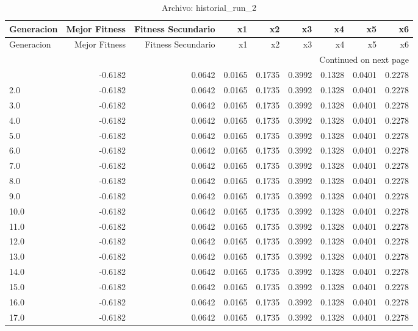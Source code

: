 \begin{longtable}{lrrrrrrrr}
\caption{Archivo: historial\_run\_2}\label{tab:historial_run_2} \\
\toprule
Generacion & Mejor Fitness & Fitness Secundario & x1 & x2 & x3 & x4 & x5 & x6 \\
\midrule
\endfirsthead
\toprule
Generacion & Mejor Fitness & Fitness Secundario & x1 & x2 & x3 & x4 & x5 & x6 \\
\midrule
\endhead
\midrule
\multicolumn{9}{r}{Continued on next page} \\
\midrule
\endfoot
\bottomrule
\endlastfoot
1.0 & -0.6182 & 0.0642 & 0.0165 & 0.1735 & 0.3992 & 0.1328 & 0.0401 & 0.2278 \\
2.0 & -0.6182 & 0.0642 & 0.0165 & 0.1735 & 0.3992 & 0.1328 & 0.0401 & 0.2278 \\
3.0 & -0.6182 & 0.0642 & 0.0165 & 0.1735 & 0.3992 & 0.1328 & 0.0401 & 0.2278 \\
4.0 & -0.6182 & 0.0642 & 0.0165 & 0.1735 & 0.3992 & 0.1328 & 0.0401 & 0.2278 \\
5.0 & -0.6182 & 0.0642 & 0.0165 & 0.1735 & 0.3992 & 0.1328 & 0.0401 & 0.2278 \\
6.0 & -0.6182 & 0.0642 & 0.0165 & 0.1735 & 0.3992 & 0.1328 & 0.0401 & 0.2278 \\
7.0 & -0.6182 & 0.0642 & 0.0165 & 0.1735 & 0.3992 & 0.1328 & 0.0401 & 0.2278 \\
8.0 & -0.6182 & 0.0642 & 0.0165 & 0.1735 & 0.3992 & 0.1328 & 0.0401 & 0.2278 \\
9.0 & -0.6182 & 0.0642 & 0.0165 & 0.1735 & 0.3992 & 0.1328 & 0.0401 & 0.2278 \\
10.0 & -0.6182 & 0.0642 & 0.0165 & 0.1735 & 0.3992 & 0.1328 & 0.0401 & 0.2278 \\
11.0 & -0.6182 & 0.0642 & 0.0165 & 0.1735 & 0.3992 & 0.1328 & 0.0401 & 0.2278 \\
12.0 & -0.6182 & 0.0642 & 0.0165 & 0.1735 & 0.3992 & 0.1328 & 0.0401 & 0.2278 \\
13.0 & -0.6182 & 0.0642 & 0.0165 & 0.1735 & 0.3992 & 0.1328 & 0.0401 & 0.2278 \\
14.0 & -0.6182 & 0.0642 & 0.0165 & 0.1735 & 0.3992 & 0.1328 & 0.0401 & 0.2278 \\
15.0 & -0.6182 & 0.0642 & 0.0165 & 0.1735 & 0.3992 & 0.1328 & 0.0401 & 0.2278 \\
16.0 & -0.6182 & 0.0642 & 0.0165 & 0.1735 & 0.3992 & 0.1328 & 0.0401 & 0.2278 \\
17.0 & -0.6182 & 0.0642 & 0.0165 & 0.1735 & 0.3992 & 0.1328 & 0.0401 & 0.2278 \\

\end{longtable}
